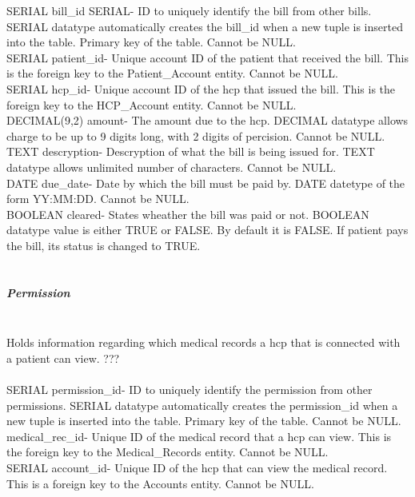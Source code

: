 \documentclass[12pt]{report}
\begin{document}
SERIAL bill_id SERIAL-  ID to uniquely identify the bill from other bills. SERIAL datatype automatically creates the bill_id when a new tuple is inserted into the table.  Primary key of the table.  Cannot be NULL.\\

SERIAL patient_id- Unique account ID of the patient that received the bill.  This is the foreign key to the Patient_Account entity.  Cannot be NULL.\\

SERIAL hcp_id- Unique account ID of the hcp that issued the bill.  This is the foreign key to the HCP_Account entity.  Cannot be NULL.\\

DECIMAL(9,2) amount- The amount due to the hcp.  DECIMAL datatype allows charge to be up to 9 digits long, with 2 digits of percision.  Cannot be NULL.\\
 
TEXT descryption- Descryption of what the bill is being issued for.  TEXT datatype allows unlimited number of characters. Cannot be NULL.\\

DATE due_date- Date by which the bill must be paid by.  DATE datetype of the form YY:MM:DD.  Cannot be NULL.\\

BOOLEAN cleared- States wheather the bill was paid or not.  BOOLEAN datatype value is either TRUE or FALSE.  By default it is FALSE.  If patient pays the bill, its status is changed to TRUE.\\ \\

\subparagraph{Permission}\\
Holds information regarding which medical records a hcp that is connected with a patient can view.  ???\\ \\

SERIAL permission_id-  ID to uniquely identify the permission from other permissions. SERIAL datatype automatically creates the permission_id when a new tuple is inserted into the table.  Primary key of the table.  Cannot be NULL.\\

medical_rec_id- Unique ID of the medical record that a hcp can view.  This is the foreign key to the Medical_Records entity.  Cannot be NULL.\\   

SERIAL account_id- Unique ID of the hcp that can view the medical record.  This is a foreign key to the Accounts entity.  Cannot be NULL.\\
\end{document}
